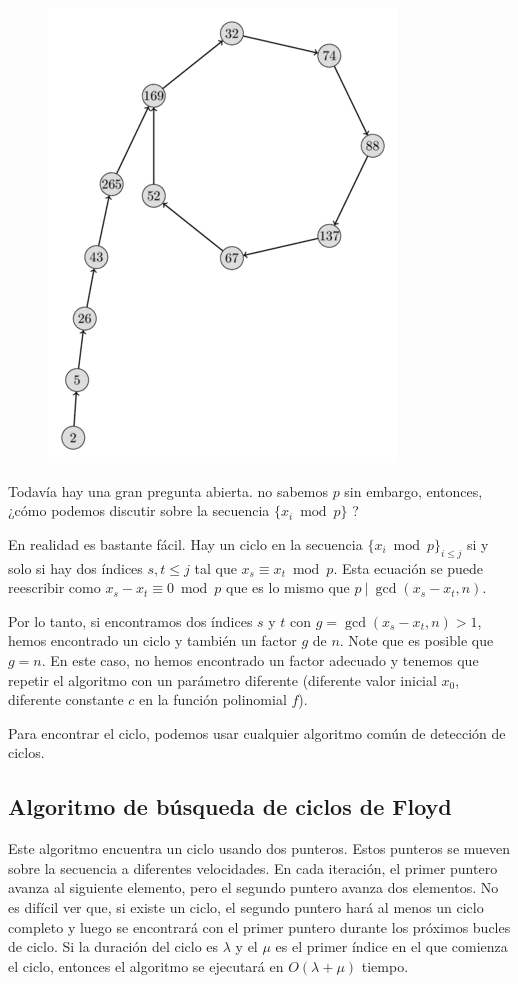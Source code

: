 \begin{figure}[h!]
	\centering
	\includegraphics[width=0.3\linewidth]{img/pollard_rho}
	\label{fig:pollardrho}
\end{figure}


Todavía hay una gran pregunta abierta. no sabemos $p$ sin embargo, entonces, ¿cómo podemos discutir sobre la secuencia $\{x_i \bmod p\}$ ?

En realidad es bastante fácil. Hay un ciclo en la secuencia $\{x_i \bmod p\}_{i \le j}$ si y solo si 
hay dos índices $s, t \le j$ tal que $x_s \equiv x_t \bmod p$. Esta ecuación se puede reescribir como 
$x_s - x_t \equiv 0 \bmod p$ que es lo mismo que $p ~|~ \gcd(x_s - x_t, n)$.

Por lo tanto, si encontramos dos índices $s$ y $t$ con $g = \gcd(x_s - x_t, n) > 1$, hemos encontrado un ciclo y también un factor $g$ de $n$. Note que es posible que $g = n$. En este caso, no hemos encontrado un factor adecuado y tenemos que repetir el algoritmo con un parámetro diferente (diferente valor inicial $x_0$, diferente constante $c$ en la función polinomial $f$).

Para encontrar el ciclo, podemos usar cualquier algoritmo común de detección de ciclos.

\subsection{Algoritmo de búsqueda de ciclos de Floyd}

Este algoritmo encuentra un ciclo usando dos punteros. Estos punteros se mueven sobre la secuencia a diferentes velocidades. En cada iteración, el primer puntero avanza al siguiente elemento, pero el segundo puntero avanza dos elementos. No es difícil ver que, si existe un ciclo, el segundo puntero hará al menos un ciclo completo y luego se encontrará con el primer puntero durante los próximos bucles de ciclo. Si la duración del ciclo es $\lambda$ y el $\mu$ es el primer índice en el que comienza el ciclo, entonces el algoritmo se ejecutará en $O(\lambda + \mu)$ tiempo.

